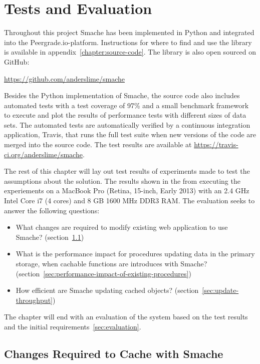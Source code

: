 \chapter{Tests and Evaluation}
\label{chapter:evaluation}

Throughout this project Smache has been implemented in Python and integrated into the Peergrade.io-platform. Instructions for where to find and use the library is available in appendix~\ref{chapter:source-code}. The library is also open sourced on GitHub:

\url{https://github.com/anderslime/smache}

Besides the Python implementation of Smache, the source code also includes automated tests with a test coverage of 97\% and a small benchmark framework to execute and plot the results of performance tests with different sizes of data sets. The automated tests are automatically verified by a continuous integration application, Travis, that runs the full test suite when new versions of the code are merged into the source code. The test results are available at \url{https://travis-ci.org/anderslime/smache}.

The rest of this chapter will lay out test results of experiments made to test the assumptions about the solution. The results shown in the from executing the experiements on a MacBook Pro (Retina, 15-inch, Early 2013) with an 2.4 GHz Intel Core i7 (4 cores) and 8 GB 1600 MHz DDR3 RAM. The evaluation seeks to answer the following questions:

\begin{itemize}
  \item What changes are required to modify existing web application to use Smache? (section~\ref{sec:changes-required-to-cache-with-smache})
  \item What is the performance impact for procedures updating data in the primary storage, when cachable functions are introduces with Smache? (section~\ref{sec:performance-impact-of-existing-procedures})
  \item How efficient are Smache updating cached objects? (section~\ref{sec:update-throughput})
\end{itemize}

The chapter will end with an evaluation of the system based on the test results and the initial requirements~\ref{sec:evaluation}.

\section{Changes Required to Cache with Smache}
\label{sec:changes-required-to-cache-with-smache}

